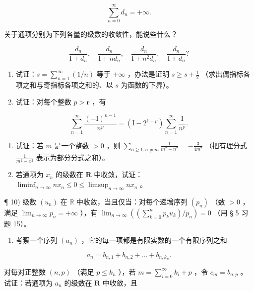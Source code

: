 \[
\sum_ {n = 0} ^ {\infty} d _ {n} = + \infty .
\]

关于通项分别为下列各量的级数的收敛性，能说些什么？

\[
\frac {d _ {n}}{\mathrm{I} + d _ {n}}, \quad \frac {d _ {n}}{\mathrm{I} + n d _ {n}}, \quad \frac {d _ {n}}{\mathrm{I} + n ^ {2} d _ {n}}, \quad \frac {d _ {n}}{\mathrm{I} + d _ {n}}?
\]

\begin{enumerate}
\def\labelenumi{\arabic{enumi})}
\setcounter{enumi}{5}
\item
试证：\(s = \sum_{n=1}^{\infty} (1/n)\) 等于 \(+\infty\) ，办法是证明 \(s \geqslant s + \frac{1}{2}\) （求出偶指标各项之和与奇指标各项之和的、以 \(s\) 为函数的下界）。
\item
试证：对每个整数 \(p > \mathbf{r}\) ，有
\end{enumerate}

\[
\sum_ {n = 1} ^ {\infty} \frac {(- \mathrm{I}) ^ {n - 1}}{n ^ {p}} = (\mathrm{I} - 2 ^ {1 - p}) \sum_ {n = 1} ^ {\infty} \frac {\mathrm{I}}{n ^ {p}}.
\]

\begin{enumerate}
\def\labelenumi{\arabic{enumi})}
\setcounter{enumi}{7}
\item
试证：若 \(m\) 是一个整数 \(> 0\) ，则 \(\sum_{n \geqslant 1, n \neq m} \frac{1}{m^2 - n^2} = -\frac{3}{4m^2}\) （把有理分式 \(\frac{1}{m^2 - x^2}\) 表示为部分分式之和）。
\item
若通项为 \(x_{n}\) 的级数在 \(\mathbf{R}\) 中收敛，试证：\(\liminf_{n\to \infty}nx_n\leqslant 0\leqslant \limsup_{n\to \infty}nx_n\) 。
\end{enumerate}

¶ 10) 级数 \((u_n)\) 在 \(\mathbb{R}\) 中收敛，当且仅当：对每个递增序列 \((p_n)\) （数 \(>0\) ，满足 \(\lim_{n\to \infty}p_n = +\infty\) ），有 \(\lim_{n\to \infty}\left(\left(\sum_{k=0}^{n}p_ku_k\right) / p_n\right) = 0\) （用 § 5 习题 15）。

\begin{enumerate}
\def\labelenumi{\arabic{enumi})}
\setcounter{enumi}{10}
\tightlist
\item
考察一个序列 \((a_{n})\) ，它的每一项都是有限实数的一个有限序列之和
\end{enumerate}

\[
a _ {n} = b _ {n, 1} + b _ {n, 2} + \dots + b _ {n, k _ {n}}.
\]

对每对正整数 \((n, p)\) （满足 \(p \leqslant k_n\) ），若 \(m = \sum_{i=0}^{\infty} k_i + p\) ，令 \(c_m = b_{n,p}\) 。试证：若通项为 \(a_n\) 的级数在 \(\mathbf{R}\) 中收敛，且

